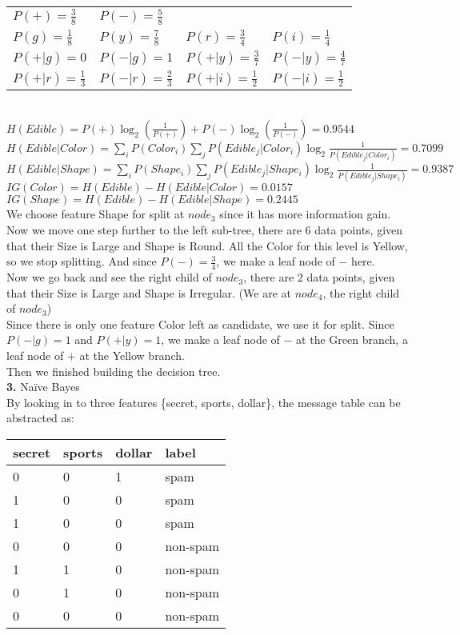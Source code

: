 \documentclass[11pt,a4paper,fleqn]{article}
\begin{document}
\begin{tabular}{llll}
$P(+) = \frac{3}{8}$&$P(-) = \frac{5}{8}$&&\\
$P(g)=\frac{1}{8}$&$P(y)=\frac{7}{8}$&$P(r)=\frac{3}{4}$&$P(i)=\frac{1}{4}$\\
$P(+|g)=0$&$P(-|g)=1$&$P(+|y)=\frac{3}{7}$&$P(-|y)=\frac{4}{7}$\\
$P(+|r)=\frac{1}{3}$&$P(-|r)=\frac{2}{3}$&$P(+|i)=\frac{1}{2}$&$P(-|i)=\frac{1}{2}$\\
\end{tabular}\\
$H(Edible) =  P(+)\log_2(\frac{1}{P(+)})+P(-)\log_2(\frac{1}{P(-)})=0.9544$\\
$H(Edible|Color) = \sum_iP(Color_i)\sum_jP(Edible_j|Color_i)\log_2\frac{1}{P(Edible_j|Color_i)}=0.7099$\\
$H(Edible|Shape) = \sum_iP(Shape_i)\sum_jP(Edible_j|Shape_i)\log_2\frac{1}{P(Edible_j|Shape_i)}=0.9387$\\
$IG(Color) = H(Edible) - H(Edible|Color) = 0.0157$\\
$IG(Shape) = H(Edible) - H(Edible|Shape) = 0.2445$\\
We choose feature Shape for split at $node_3$ since it has more information gain.\\
Now we move one step further to the left sub-tree, there are 6 data points, given that their Size is Large and Shape is Round. All the Color for this level is Yellow, so we stop splitting. And since $P(-)=\frac{3}{4}$, we make a leaf node of $-$ here.\\
Now we go back and see the right child of $node_3$, there are 2 data points, given that their Size is Large and Shape is Irregular. (We are at $node_4$, the right child of $node_3$)\\
Since there is only one feature Color left as candidate, we use it for split. Since $P(-|g)=1$ and $P(+|y) = 1$, we make a leaf node of $-$ at the Green branch, a leaf node of $+$ at the Yellow branch.\\
Then we finished building the decision tree.\\
\newpage \noindent
\textbf{3.} Na\"{i}ve Bayes\\
By looking in to three features \{secret, sports, dollar\}, the message table can be abstracted as:\\
\begin{tabular}{|l|l|l|l|}
\hline
secret&sports&dollar&label\\
\hline
0&0&1&spam\\
1&0&0&spam\\
1&0&0&spam\\
0&0&0&non-spam\\
1&1&0&non-spam\\
0&1&0&non-spam\\
0&0&0&non-spam\\
\hline
\end{tabular}\\
\end{document}
